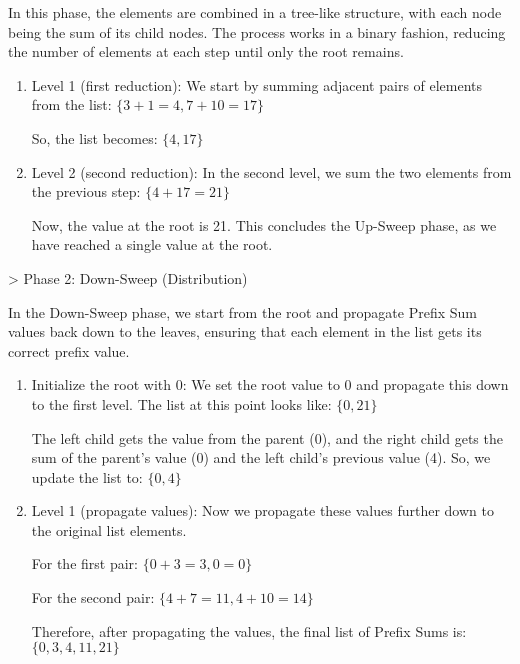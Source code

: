 \documentclass[a4paper,10pt]{article}
\begin{document}
        In this phase, the elements are combined in a tree-like structure, with each node being the sum of its child nodes. The process works in a binary fashion, reducing the number of elements at each step until only the root remains.

        \begin{enumerate}
            
            \item Level 1 (first reduction): We start by summing adjacent pairs of elements from the list: $\{3+1=4, 7+10=17\}$

            So, the list becomes: $\{4, 17\}$

            \item Level 2 (second reduction): In the second level, we sum the two elements from the previous step: $\{4+17=21\}$

            Now, the value at the root is 21. This concludes the Up-Sweep phase, as we have reached a single value at the root.

        \end{enumerate}

        \noindent
        {\bold > \hspace{10pt} Phase 2: Down-Sweep (Distribution)}

        In the Down-Sweep phase, we start from the root and propagate Prefix Sum values back down to the leaves, ensuring that each element in the list gets its correct prefix value.

        \begin{enumerate}
            
            \item Initialize the root with 0: We set the root value to 0 and propagate this down to the first level. The list at this point looks like: $\{0, 21\}$
                
            The left child gets the value from the parent (0), and the right child gets the sum of the parent’s value (0) and the left child’s previous value (4). So, we update the list to: $\{0, 4\}$

            \item Level 1 (propagate values): Now we propagate these values further down to the original list elements.

            For the first pair: $\{0+3=3, 0=0\}$

            For the second pair: $\{4+7=11, 4+10=14\}$

            Therefore, after propagating the values, the final list of Prefix Sums is: $\{0, 3, 4, 11, 21\}$

        \end{enumerate}
\end{document}
